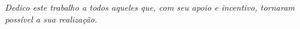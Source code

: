 \textit{Dedico este trabalho a todos aqueles que, com seu apoio e incentivo, tornaram possível a sua realização.}